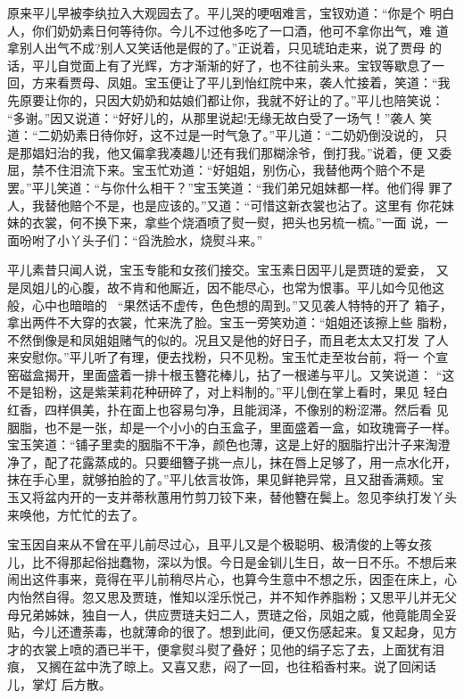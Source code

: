 原来平儿早被李纨拉入大观园去了。平儿哭的哽咽难言，宝钗劝道：“你是个
明白人，你们奶奶素日何等待你。今儿不过他多吃了一口酒，他可不拿你出气，难
道拿别人出气不成?别人又笑话他是假的了。”正说着，只见琥珀走来，说了贾母
的话，平儿自觉面上有了光辉，方才渐渐的好了，也不往前头来。宝钗等歇息了一
回，方来看贾母、凤姐。宝玉便让了平儿到怡红院中来，袭人忙接着，笑道：“我
先原要让你的，只因大奶奶和姑娘们都让你，我就不好让的了。”平儿也陪笑说：
“多谢。”因又说道：“好好儿的，从那里说起!无缘无故白受了一场气！”袭人
笑道：“二奶奶素日待你好，这不过是一时气急了。”平儿道：“二奶奶倒没说的，
只是那娼妇治的我，他又偏拿我凑趣儿!还有我们那糊涂爷，倒打我。”说着，便
又委屈，禁不住泪流下来。宝玉忙劝道：“好姐姐，别伤心，我替他两个赔个不是
罢。”平儿笑道：“与你什么相干？”宝玉笑道：“我们弟兄姐妹都一样。他们得
罪了人，我替他赔个不是，也是应该的。”又道：“可惜这新衣裳也沾了。这里有
你花妹妹的衣裳，何不换下来，拿些个烧酒喷了熨一熨，把头也另梳一梳。”一面
说，一面吩咐了小丫头子们：“舀洗脸水，烧熨斗来。”

平儿素昔只闻人说，宝玉专能和女孩们接交。宝玉素日因平儿是贾琏的爱妾，
又是凤姐儿的心腹，故不肯和他厮近，因不能尽心，也常为恨事。平儿如今见他这
般，心中也暗暗的：“果然话不虚传，色色想的周到。”又见袭人特特的开了
箱子，拿出两件不大穿的衣裳，忙来洗了脸。宝玉一旁笑劝道：“姐姐还该擦上些
脂粉，不然倒像是和凤姐姐赌气的似的。况且又是他的好日子，而且老太太又打发
了人来安慰你。”平儿听了有理，便去找粉，只不见粉。宝玉忙走至妆台前，将一
个宣窑磁盒揭开，里面盛着一排十根玉簪花棒儿，拈了一根递与平儿。又笑说道：
“这不是铅粉，这是紫茉莉花种研碎了，对上料制的。”平儿倒在掌上看时，果见
轻白红香，四样俱美，扑在面上也容易匀净，且能润泽，不像别的粉涩滞。然后看
见胭脂，也不是一张，却是一个小小的白玉盒子，里面盛着一盒，如玫瑰膏子一样。
宝玉笑道：“铺子里卖的胭脂不干净，颜色也薄，这是上好的胭脂拧出汁子来淘澄
净了，配了花露蒸成的。只要细簪子挑一点儿，抹在唇上足够了，用一点水化开，
抹在手心里，就够拍脸的了。”平儿依言妆饰，果见鲜艳异常，且又甜香满颊。宝
玉又将盆内开的一支并蒂秋蕙用竹剪刀铰下来，替他簪在鬓上。忽见李纨打发丫头
来唤他，方忙忙的去了。

宝玉因自来从不曾在平儿前尽过心，且平儿又是个极聪明、极清俊的上等女孩
儿，比不得那起俗拙蠢物，深以为恨。今日是金钏儿生日，故一日不乐。不想后来
闹出这件事来，竟得在平儿前稍尽片心，也算今生意中不想之乐，因歪在床上，心
内怡然自得。忽又思及贾琏，惟知以淫乐悦己，并不知作养脂粉；又思平儿并无父
母兄弟姊妹，独自一人，供应贾琏夫妇二人，贾琏之俗，凤姐之威，他竟能周全妥
贴，今儿还遭荼毒，也就薄命的很了。想到此间，便又伤感起来。复又起身，见方
才的衣裳上喷的酒已半干，便拿熨斗熨了叠好；见他的绢子忘了去，上面犹有泪痕，
又搁在盆中洗了晾上。又喜又悲，闷了一回，也往稻香村来。说了回闲话儿，掌灯
后方散。

